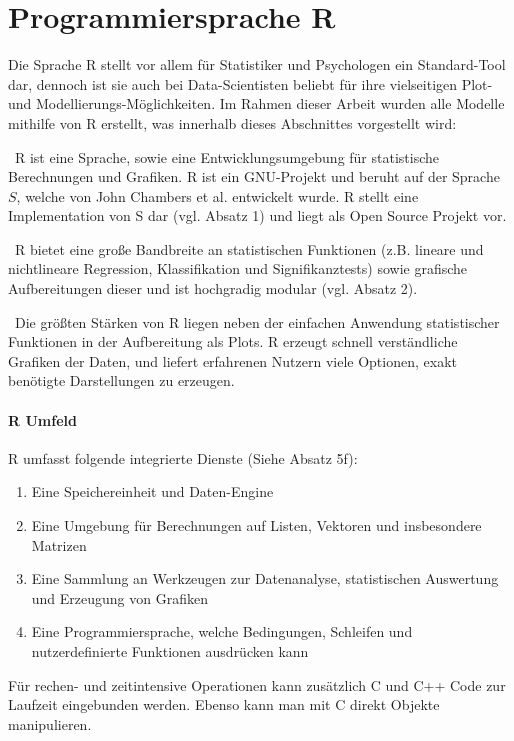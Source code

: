 \section{Programmiersprache R}
\label{sec:R}
Die Sprache R stellt vor allem für Statistiker und Psychologen ein Standard-Tool dar, dennoch ist sie auch bei Data-Scientisten beliebt für ihre vielseitigen Plot- und Modellierungs-Möglichkeiten. Im Rahmen dieser Arbeit wurden alle Modelle mithilfe von R erstellt, was innerhalb dieses Abschnittes vorgestellt wird:

~\newline R ist eine Sprache, sowie eine Entwicklungsumgebung für statistische Berechnungen und Grafiken. R ist ein GNU-Projekt und beruht auf der Sprache $S$, welche von John Chambers et al. entwickelt wurde. R stellt eine Implementation von S dar (vgl. \cite{RProject} Absatz 1) und liegt als Open Source Projekt vor.

~\newline R bietet eine große Bandbreite an statistischen Funktionen (z.B. lineare und nichtlineare Regression, Klassifikation und Signifikanztests) sowie grafische Aufbereitungen dieser und ist hochgradig modular (vgl. \cite{RProject} Absatz 2). 

~\newline Die größten Stärken von R liegen neben der einfachen Anwendung statistischer Funktionen in der Aufbereitung als Plots. R erzeugt schnell verständliche Grafiken der Daten, und liefert erfahrenen Nutzern viele Optionen, exakt benötigte Darstellungen zu erzeugen. 

\paragraph{ R Umfeld} 
R umfasst folgende integrierte Dienste (Siehe \cite{RProject} Absatz 5f):
\begin{enumerate}
	\item Eine Speichereinheit und Daten-Engine
	\item Eine Umgebung für Berechnungen auf Listen, Vektoren und insbesondere Matrizen
	\item Eine Sammlung an Werkzeugen zur Datenanalyse, statistischen Auswertung und Erzeugung von Grafiken
	\item Eine Programmiersprache, welche Bedingungen, Schleifen und nutzerdefinierte Funktionen ausdrücken kann
\end{enumerate}

Für rechen- und zeitintensive Operationen kann zusätzlich C und C++ Code zur Laufzeit eingebunden werden. Ebenso kann man mit C direkt Objekte manipulieren. 

